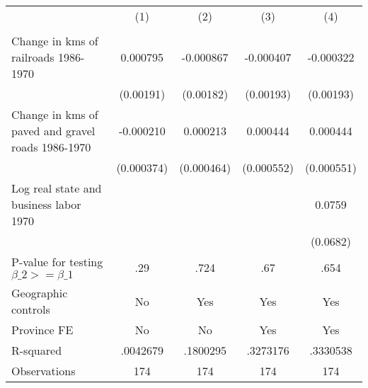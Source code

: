 {
\def\sym#1{\ifmmode^{#1}\else\(^{#1}\)\fi}
\begin{tabular}{l*{4}{c}}
\hline\hline
                &\multicolumn{1}{c}{(1)}&\multicolumn{1}{c}{(2)}&\multicolumn{1}{c}{(3)}&\multicolumn{1}{c}{(4)}\\
                &\multicolumn{1}{c}{}&\multicolumn{1}{c}{}&\multicolumn{1}{c}{}&\multicolumn{1}{c}{}\\
\hline
Change in kms of railroads 1986-1970& 0.000795         &-0.000867         &-0.000407         &-0.000322         \\
                &(0.00191)         &(0.00182)         &(0.00193)         &(0.00193)         \\
[1em]
Change in kms of paved and gravel roads 1986-1970&-0.000210         & 0.000213         & 0.000444         & 0.000444         \\
                &(0.000374)         &(0.000464)         &(0.000552)         &(0.000551)         \\
[1em]
Log real state and business labor 1970&                  &                  &                  &   0.0759         \\
                &                  &                  &                  & (0.0682)         \\
\hline
P-value for testing $\beta\_{2} >= \beta\_{1}$&      .29         &     .724         &      .67         &     .654         \\
Geographic controls&       No         &      Yes         &      Yes         &      Yes         \\
Province FE     &       No         &       No         &      Yes         &      Yes         \\
R-squared       & .0042679         & .1800295         & .3273176         & .3330538         \\
Observations    &      174         &      174         &      174         &      174         \\
\hline\hline
\end{tabular}
}
